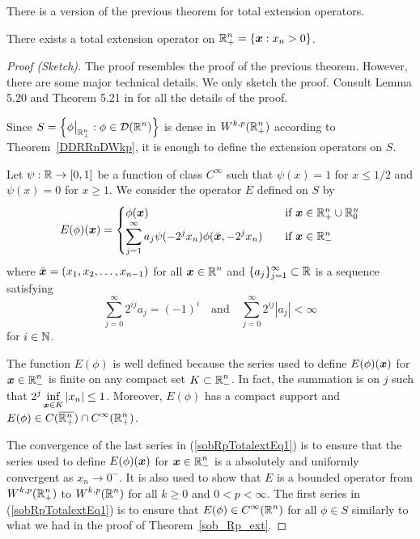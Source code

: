 There is a version of the previous theorem for total extension operators.

\begin{theorem} \label{sob_Rp_Totalext}
There exists a total extension operator on
$\displaystyle \mathbb{R}^n_+ = \{ {\bm{x}} : x_n>0 \}$.
\end{theorem}

\begin{proof}[Proof (Sketch)]
The proof resembles the proof of the previous theorem.  However, there
are some major technical details.  We only sketch the proof.  Consult
Lemma 5.20 and Theorem 5.21 in \cite{Ad} for all the details of the
proof.

Since
$\displaystyle S = \left\{ \phi\big|_{\mathbb{R}^n_+} : \phi \in \mathcal{D}(\mathbb{R}^n) \right\}$
is dense in $\displaystyle W^{k,p}(\mathbb{R}^n_+)$ according to
Theorem~\ref{DDRRnDWkp}, it is enough to define the extension operators
on $S$.

Let $\psi:\mathbb{R} \to [0,1]$ be a function of class $\displaystyle C^\infty$
such that $\psi(x) = 1$ for $x \leq 1/2$ and $\psi(x) = 0$ for $x \geq 1$.
We consider the operator $E$ defined on $S$ by
\[
E(\phi)({\bm{x}})
= \begin{cases}
\phi({\bm{x}}) & \quad \text{if} \ {\bm{x}} \in \mathbb{R}^n_+ \cup \mathbb{R}^n_0 \\
\displaystyle \sum_{j=1}^\infty a_j \psi(-2^jx_n)\phi(\breve{{\bm{x}}},-2^jx_n)
& \quad \text{if} \ {\bm{x}} \in \mathbb{R}^n_-
\end{cases}
\]
where $\breve{{\bm{x}}} = (x_1,x_2,\ldots, x_{n-1})$ for all
$\displaystyle {\bm{x}} \in \mathbb{R}^n$ and
$\displaystyle \{a_j\}_{j=1}^\infty \subset \mathbb{R}$ is a
sequence satisfying
\begin{equation} \label{sobRpTotalextEq1}
\sum_{j=0}^\infty 2^{ij} a_j = (-1)^i \quad \text{and} \quad
\sum_{j=0}^\infty 2^{ij} |a_j| < \infty
\end{equation}
for $i \in \mathbb{N}$.

The function $E(\phi)$ is well defined because the series used to
define $E(\phi)({\bm{x}})$ for $\displaystyle {\bm{x}} \in \mathbb{R}^n_-$ is finite
on any compact set $\displaystyle K \subset \mathbb{R}^n_-$.  
In fact, the summation is on $j$
such that $\displaystyle 2^j \inf_{{\bm{x}} \in K} |x_n| \leq 1$.
Moreover, $E(\phi)$ has a compact support and
$\displaystyle E(\phi) \in C(\overline{\mathbb{R}^n_+}) \cap C^{\infty}(\mathbb{R}^n_+)$.

The convergence of the last series in (\ref{sobRpTotalextEq1}) is to
ensure that the series used to define $E(\phi)({\bm{x}})$ for
$\displaystyle {\bm{x}} \in \mathbb{R}^n_-$ is 
a absolutely and uniformly convergent as $x_n \to 0^-$.  It is also
used to show that $E$ is a bounded operator from
$\displaystyle W^{k,p}(\mathbb{R}^n_+)$ to $\displaystyle W^{k,p}(\mathbb{R}^n)$ for
all $k\geq 0$ and $0 < p < \infty$.  The first series in
(\ref{sobRpTotalextEq1}) is to ensure that
$\displaystyle E(\phi) \in C^\infty(\mathbb{R}^n)$
for all $\phi \in S$ similarly to what we had in the proof of
Theorem~\ref{sob_Rp_ext}.
\end{proof}

